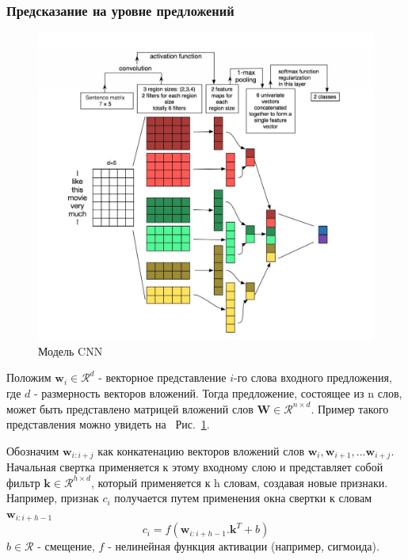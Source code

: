 \subsubsection{Предсказание на уровне предложений}
\begin{figure}[t]
	\includegraphics[scale=0.45]{img/CNN}
	\centering
	\caption{Модель CNN}\label{fig:CNN}
\end{figure}
Положим ${\mathbf w_{i}} \in \mathcal{R}^d$ - векторное представление $i$-го слова входного предложения, где $d$ - размерность векторов вложений. Тогда предложение, состоящее из n слов, может быть представлено матрицей вложений слов ${\mathbf W} \in \mathcal{R}^{n \times d}$. Пример такого представления можно увидеть на ~Рис.~\ref{fig:CNN}.

Обозначим ${\mathbf w_{i:i+j}} $ как конкатенацию векторов
 вложений слов ${\mathbf w_{i}}, {\mathbf w_{i+1}}, ... {\mathbf w_{i+j}}$. Начальная свертка применяется к этому входному слою и представляет собой фильтр ${\mathbf k} \in \mathcal{R}^{h \times d}$, который применяется к h словам, создавая новые признаки. Например, признак $c_i$ получается путем применения окна свертки к словам ${\mathbf w_{i:i+h-1}} $
\begin{equation}
c_i = f({\mathbf w_{i:i+h-1}}.{\mathbf k}^T + b )
\end{equation} 
 $b \in \mathcal{R}$ - смещение, $f$ - нелинейная функция активации (например, сигмоида). 
 
